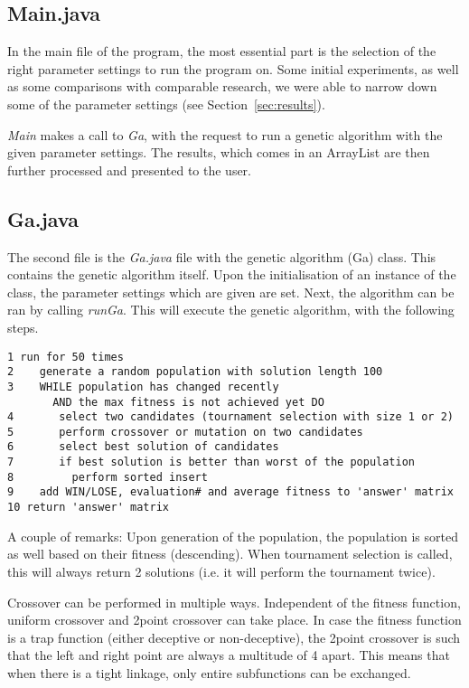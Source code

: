 \documentclass[10pt,a4paper,onecolumn]{article}
\begin{document}
\subsection{Main.java}
In the main file of the program, the most essential part is the selection of the right parameter settings to run the program on. Some initial experiments, as well as some comparisons with comparable research, we were able to narrow down some of the parameter settings (see Section~\ref{sec:results}). 

\textit{Main} makes a call to \textit{Ga}, with the request to run a genetic algorithm with the given parameter settings. The results, which comes in an ArrayList are then further processed and presented to the user.


\subsection{Ga.java}
The second file is the \textit{Ga.java} file with the genetic algorithm (Ga) class. This contains the genetic algorithm itself. Upon the initialisation of an instance of the class, the parameter settings which are given are set. Next, the algorithm can be ran by calling \textit{runGa}. This will execute the genetic algorithm, with the following steps.

\begin{verbatim}
1 run for 50 times
2    generate a random population with solution length 100
3    WHILE population has changed recently 
       AND the max fitness is not achieved yet DO
4       select two candidates (tournament selection with size 1 or 2)
5       perform crossover or mutation on two candidates
6       select best solution of candidates
7       if best solution is better than worst of the population
8         perform sorted insert
9    add WIN/LOSE, evaluation# and average fitness to 'answer' matrix
10 return 'answer' matrix
\end{verbatim}

A couple of remarks: Upon generation of the population, the population is sorted as well based on their fitness (descending). When tournament selection is called, this will always return 2 solutions (i.e. it will perform the tournament twice). 

Crossover can be performed in multiple ways. Independent of the fitness function, uniform crossover and 2point crossover can take place. In case the fitness function is a trap function (either deceptive or non-deceptive), the 2point crossover is such that the left and right point are always a multitude of 4 apart. This means that when there is a tight linkage, only entire subfunctions can be exchanged.
\end{document}
